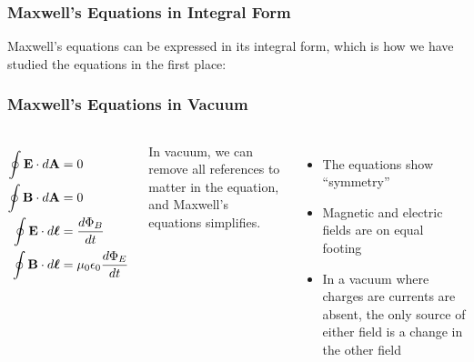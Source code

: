 \documentclass[12pt,aspectratio=169]{beamer}
\begin{document}
\begin{frame}
  \frametitle{Maxwell's Equations in Integral Form}
  Maxwell's equations can be expressed in its integral form, which is how we
  have studied the equations in the first place:

\end{frame}



\begin{frame}
  \frametitle{Maxwell's Equations in Vacuum}
  \begin{columns}
    
    {\Large
      \begin{align*}
        \oint\mathbf{E}\cdot d\mathbf{A} &= 0 \\
        \oint\mathbf{B}\cdot d\mathbf{A} &= 0 \\
        \oint\mathbf{E}\cdot d\boldsymbol{\ell}&=\frac{d\Phi_B}{dt} \\
        \oint\mathbf{B}\cdot d\boldsymbol{\ell}&=\mu_0\epsilon_0\frac{d\Phi_E}{dt}\\
      \end{align*}
    }

    In vacuum, we can remove all references to matter in the equation, and
    Maxwell's equations simplifies.
    \begin{itemize}
    \item The equations show ``symmetry''
    \item Magnetic and electric fields are on equal footing
    \item In a vacuum where charges are currents are absent, the only source of
      either field is a change in the other field
    \end{itemize}
  \end{columns}
\end{frame}
\end{document}
